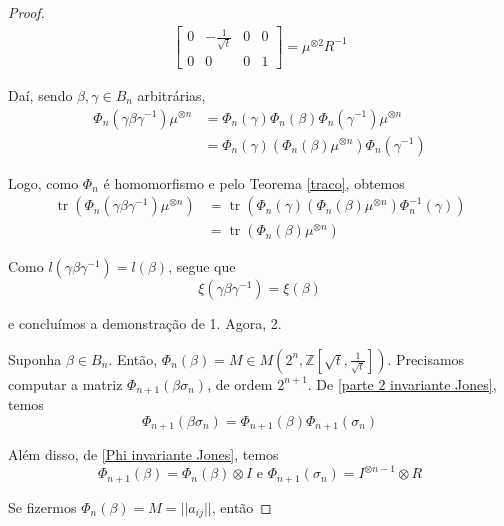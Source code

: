 \documentclass[a4paper,portuguese,11pt,twoside, leqno]{book}
\DeclareMathOperator{\tr}{tr}
\theoremstyle{definition}
\begin{document}
\begin{proof}
\begin{align*}
\begin{bmatrix}
		0 & -\frac{1}{\sqrt{t}} & 0 & 0 \\
		0 & 0 & 0 & 1
		\end{bmatrix} = \mu^{\otimes 2}R^{-1}
		\end{align*}
		\par\vspace{0.3cm} Daí, sendo $\beta, \gamma\in B_n$ arbitrárias, 
		\begin{align*}
		\Phi_n(\gamma\beta\gamma^{-1}) \mu^{\otimes n} &= \Phi_n(\gamma)\Phi_n(\beta)\Phi_n(\gamma^{-1})\mu^{\otimes n} \\
		&= \Phi_n(\gamma)(\Phi_n(\beta)\mu^{\otimes n})\Phi_n(\gamma^{-1})
		\end{align*}
		\par\vspace{0.3cm} Logo, como $\Phi_n$ é homomorfismo e pelo Teorema \eqref{traco}, obtemos
		\begin{align*}
		\tr(\Phi_n(\gamma\beta\gamma^{-1}) \mu^{\otimes n})	&= \tr(\Phi_n(\gamma)(\Phi_n(\beta)\mu^{\otimes n})\Phi_n^{-1}(\gamma)) \\
		&= \tr(\Phi_n(\beta)\mu^{\otimes n})
		\end{align*}
		\par\vspace{0.3cm} Como $l(\gamma\beta\gamma^{-1}) = l(\beta)$, segue que
		\begin{equation*}
		\xi(\gamma\beta\gamma^{-1}) = \xi(\beta)
		\end{equation*}
		\par\vspace{0.3cm} e concluímos a demonstração de 1. Agora, 2.
		\par\vspace{0.3cm} Suponha $\beta\in B_n$. Então, $\Phi_n(\beta) = M\in M(2^n, \mathbb{Z}[\sqrt{t}, \frac{1}{\sqrt{t}}])$. Precisamos computar a matriz $\Phi_{n+1}(\beta\sigma_n)$, de ordem $2^{n+1}$. De \eqref{parte 2 invariante Jones}, temos
		\begin{equation*}
		\Phi_{n+1}(\beta\sigma_n) = \Phi_{n+1}(\beta)\Phi_{n+1}(\sigma_n)
		\end{equation*}
		\par\vspace{0.3cm} Além disso, de \eqref{Phi invariante Jones}, temos
		\begin{equation*}
		\Phi_{n+1}(\beta) = \Phi_n(\beta)\otimes I \text{ e }\Phi_{n+1}(\sigma_n) = I^{\otimes n-1}\otimes R
		\end{equation*}
		\par\vspace{0.3cm} Se fizermos $\Phi_n(\beta) = M = ||a_{ij}||$, então

\end{proof}
\end{document}
